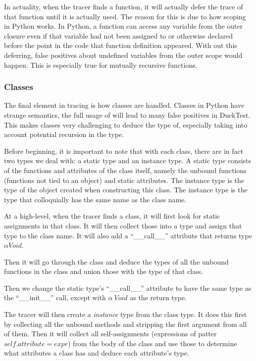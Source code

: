 \documentclass{scrartcl}
\begin{document}
\begin{multicols}{2}
In actuality, when the tracer finds a function, it will actually defer
the trace of that function until it is actually used. The reason for this
is due to how scoping in Python works. In Python, a function can access
any variable from the outer closure even if that variable had not been assigned
to or otherwise declared before the point in the code that function definition
appeared. With out this deferring, false positives about undefined variables
from the outer scope would happen. This is especially true for mutually recursive
functions.

\subsubsection*{Classes}

The final element in tracing is how classes are handled. Classes in Python
have strange semantics, the full usage of will lead to many false positives
in DuckTest. This makes classes very challenging to deduce the type of, especially
taking into account potential recursion in the type.

Before beginning, it is important to note that with each class, there are in fact two types
we deal with: a static type and an instance type. A static type consists of
the functions and attributes of the class itself, namely the unbound functions
(functions not tied to an object) and static attributes. The instance type is
the type of the object created when constructing this class. The instance type
is the type that colloquially has the same name as the class name.

At a high-level, when the tracer finds a class, it
will first look for static assignments in that class. It will then
collect those into a type and assign that type to the class name.
It will also add a ``\_\_call\_\_'' attribute that returns type $\alpha Void$.

Then it will go through the class and deduce the types of all the unbound
functions in the class and union those with the type of that class.

Then we change the static type's ``\_\_call\_\_'' attribute to have the same type
as the ``\_\_init\_\_'' call, except with $\alpha\ Void$ as the return type.

The tracer will then create a \emph{instance} type from the class type.  It
does this first by collecting all the unbound methods and stripping the first
argument from all of them. Then it will collect all self-assignments
(expressions of patter $self.attribute = expr$) from the body of the class and
use those to determine what attributes a class has and deduce each attribute's
type.


\end{multicols}
\end{document}
